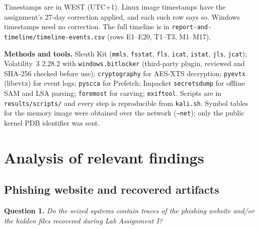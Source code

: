 \documentclass[11pt,a4paper,final,oneside]{article}
\begin{document}
Timestamps are in WEST (UTC+1). Linux image timestamps have the assignment's 27-day correction applied, and each such row says so. Windows timestamps need no correction. The full timeline is in \texttt{report-and-timeline/timeline-events.csv} (rows E1--E20, T1--T3, M1--M17).

\textbf{Methods and tools.} Sleuth Kit (\texttt{mmls}, \texttt{fsstat}, \texttt{fls}, \texttt{icat}, \texttt{istat}, \texttt{jls}, \texttt{jcat}); Volatility~3 2.28.2 with \texttt{windows.bitlocker} (third-party plugin, reviewed and SHA-256 checked before use); \texttt{cryptography} for AES-XTS decryption; \texttt{pyevtx} (libevtx) for event logs; \texttt{pyscca} for Prefetch; Impacket \texttt{secretsdump} for offline SAM and LSA parsing; \texttt{foremost} for carving; \texttt{exiftool}. Scripts are in \texttt{results/scripts/} and every step is reproducible from \texttt{kali.sh}. Symbol tables for the memory image were obtained over the network (\texttt{--net}); only the public kernel PDB identifier was sent.

\section{Analysis of relevant findings}
\label{sec:analysis}

\subsection{Phishing website and recovered artifacts}
\label{sec:q1}

\textbf{Question 1.} \textit{Do the seized systems contain traces of the phishing website and/or the hidden files recovered during Lab Assignment I?}
\end{document}
